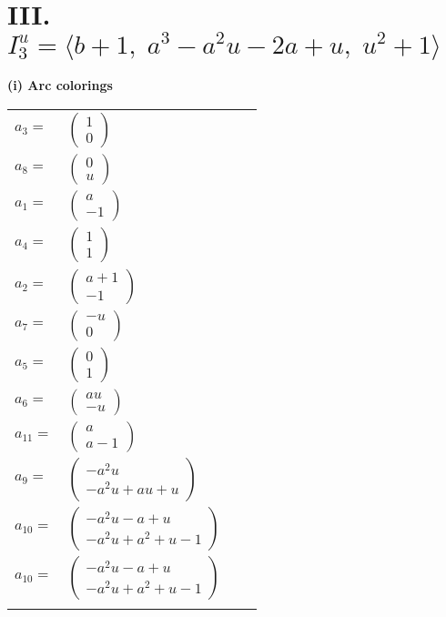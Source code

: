 \documentclass[1p]{elsarticle_modified}
\theoremstyle{definition}
\begin{document}
\centering \section*{III. $I^u_{3}= \langle b+1,\;a^3- a^2 u-2 a+u,\;u^2+1 \rangle$}
\flushleft \textbf{(i) Arc colorings}\\
\begin{tabular}{m{7pt} m{180pt} m{7pt} m{180pt} }
\flushright $a_{3}=$&$\begin{pmatrix}1\\0\end{pmatrix}$ \\
\flushright $a_{8}=$&$\begin{pmatrix}0\\u\end{pmatrix}$ \\
\flushright $a_{1}=$&$\begin{pmatrix}a\\-1\end{pmatrix}$ \\
\flushright $a_{4}=$&$\begin{pmatrix}1\\1\end{pmatrix}$ \\
\flushright $a_{2}=$&$\begin{pmatrix}a+1\\-1\end{pmatrix}$ \\
\flushright $a_{7}=$&$\begin{pmatrix}- u\\0\end{pmatrix}$ \\
\flushright $a_{5}=$&$\begin{pmatrix}0\\1\end{pmatrix}$ \\
\flushright $a_{6}=$&$\begin{pmatrix}a u\\- u\end{pmatrix}$ \\
\flushright $a_{11}=$&$\begin{pmatrix}a\\a-1\end{pmatrix}$ \\
\flushright $a_{9}=$&$\begin{pmatrix}- a^2 u\\- a^2 u+a u+u\end{pmatrix}$ \\
\flushright $a_{10}=$&$\begin{pmatrix}- a^2 u- a+u\\- a^2 u+a^2+u-1\end{pmatrix}$\\ \flushright $a_{10}=$&$\begin{pmatrix}- a^2 u- a+u\\- a^2 u+a^2+u-1\end{pmatrix}$\\&\end{tabular}
\end{document}

